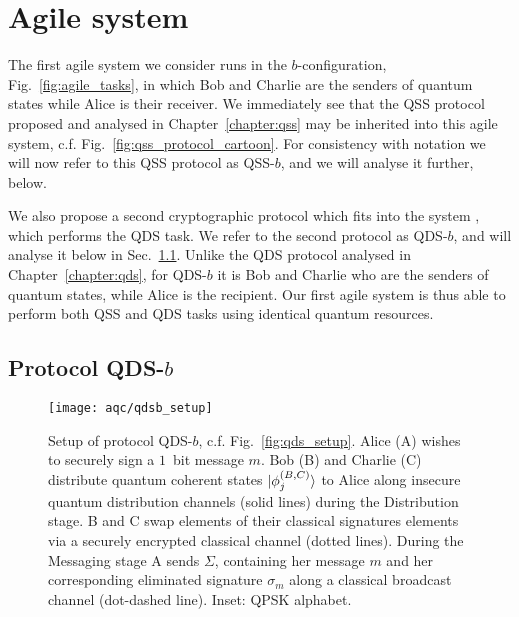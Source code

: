 \section{Agile system \systemB}\label{sec:aqc_systemb}
The first agile system we consider runs in the $b$-configuration, Fig.~\ref{fig:agile_tasks}, in which Bob and Charlie are the senders of quantum states while Alice is their receiver. We immediately see that the QSS protocol proposed and analysed in Chapter~\ref{chapter:qss} may be inherited into this agile system, c.f. Fig.~\ref{fig:qss_protocol_cartoon}. For consistency with notation we will now refer to this QSS protocol as QSS-$b$, and we will analyse it further, below. 

We also propose a second cryptographic protocol which fits into the system \systemB, which performs the QDS task. We refer to the second protocol as QDS-$b$, and will analyse it below in Sec.~\ref{sec:aqc_qdsb}. Unlike the QDS protocol analysed in Chapter~\ref{chapter:qds}, for QDS-$b$ it is Bob and Charlie who are the senders of quantum states, while Alice is the recipient. %
Our first agile system \systemB \; is thus able to perform both QSS and QDS tasks using identical quantum resources. %

\subsection{Protocol QDS-$b$}\label{sec:aqc_qdsb}


\begin{figure}[htp]
\captionsetup{width=0.8\linewidth}
\centering
\texttt{[image: aqc/qdsb\_setup]}
\caption{\label{fig:qdsb_setup} Setup of protocol QDS-$b$, c.f. Fig.~\ref{fig:qds_setup}. Alice (A) wishes to securely sign a $1$~bit message $m$. Bob (B) and Charlie (C) distribute quantum coherent states $\ket{\phi_j^{\left(B, C\right)}}$ to Alice along insecure quantum distribution channels (solid lines) during the Distribution stage. B and C swap elements of their classical signatures elements via a securely encrypted classical channel (dotted lines). During the Messaging stage A sends $\Sigma$, containing her message $m$ and her corresponding eliminated signature $\sigma_m$ along a classical broadcast channel (dot-dashed line). Inset: QPSK alphabet.}
\end{figure}

